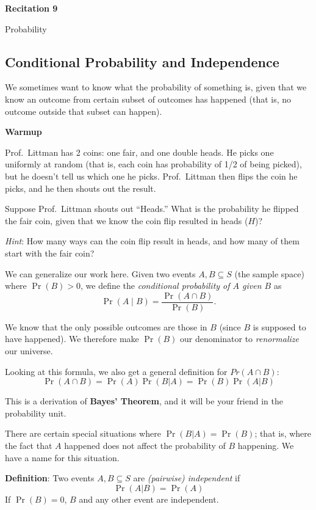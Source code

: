 \documentclass[12pt,letterpaper]{article}
\newif\ifsol
\newcommand{\solu}[2]{ \begin{mdframed} \ifsol #2 \else \vspace{#1} \fi \end{mdframed} }
\begin{document}
  \thispagestyle{firstpagestyle}
  \begin{center}
    {\large \textbf{Recitation 9}}
    
    {\large Probability}

  \end{center}

\subsection*{Conditional Probability and Independence}

We sometimes want to know what the probability of something is, given that we know an outcome from certain subset of outcomes has happened (that is, no outcome outside that subset can happen).

\textbf{Warmup}

Prof.\ Littman has 2 coins: one fair, and one double heads. He picks one uniformly at random (that is, each coin has probability of 1/2 of being picked), but he doesn't tell us which one he picks. Prof.\ Littman then flips the coin he picks, and he then shouts out the result.

Suppose Prof.\ Littman shouts out ``Heads.'' What is the probability he flipped the fair coin, given that we know the coin flip resulted in heads ($H$)?

\textit{Hint}: How many ways can the coin flip result in heads, and how many of them start with the fair coin?
\solu{2cm}{1/3}

We can generalize our work here. Given two events $A,B \subseteq S$ (the sample space) where $\Pr(B) > 0$, we define the \textit{conditional probability of $A$ given $B$} as $$
\Pr(A\mid B) = \frac{\Pr(A \cap B)}{\Pr(B)}.
$$

We know that the only possible outcomes are those in $B$ (since $B$ is supposed to have happened). We therefore make $\Pr(B)$ our denominator to \textit{renormalize} our universe. 

Looking at this formula, we also get a general definition for $Pr(A \cap B)$:
$$\Pr(A \cap B) = \Pr(A)\Pr(B | A) = \Pr(B)\Pr(A | B)$$

This is a derivation of \textbf{Bayes' Theorem}, and it will be your friend in the probability unit.

There are certain special situations where $\Pr(B | A) = \Pr(B)$; that is, where the fact that $A$ happened does not affect the probability of $B$ happening. We have a name for this situation.

\textbf{Definition}: Two events $A,B \subseteq S$ are \textit{(pairwise) independent} if $$\Pr(A|B)=\Pr(A)$$
If $\Pr(B)=0$, $B$ and any other event are independent.
\end{document}
